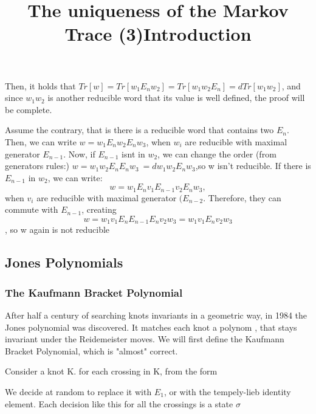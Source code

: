 \documentclass{article}
\begin{document}
{Then, it holds that \(Tr[w]=Tr[w_{1}E_{n}w_{2}] = Tr[w_{1}w_{2}E_{n}] = dTr[w_{1}w_{2}]\), and
since \(w_{1}w_{2}\) is another reducible word that its value is well defined, the proof will be complete.   


\title{The uniqueness of the Markov Trace (3)}
Assume the contrary, that is there is a reducible word that contains two \(E_{n}\).
Then, we can write \(w=w_{1}E_{n}w_{2}E_{n}w_{3}\), when \(w_{i}\) are reducible with maximal generator
\(E_{n-1}\). Now, if \(E_{n-1}\) isnt in \(w_{2}\), we can change the order (from generators rules:)
\(w=w_{1}w_{2}E_{n}E_{n}w_{3}\ = dw_{1}w_{2}E_{n}w_{3}\),so w isn't reducible.
If there is \(E_{n-1}\) in  \(w_{2}\), we can write:
\begin{displaymath}
 w=w_{1}E_{n}v_{1}E_{n-1}v_{2}E_{n}w_{3},
 \end{displaymath} 
 when 
 \(v_{i}\)  are reducible with maximal generator
\((E_{n-2}\). Therefore, they can commute with \(E_{n-1}\), creating 
\begin{displaymath}
w=w_{1}v_{1}E_{n}E_{n-1}E_{n}v_{2}w_{3}
= w_{1}v_{1}E_{n}v_{2}w_{3}
 \end{displaymath} 
 , so w again is not reducible
   



\subsection{Jones Polynomials} 
\subsubsection{The Kaufmann Bracket Polynomial}
\title{Introduction}
After half a century of searching knots invariants in a geometric way, in 1984 the Jones polynomial
was discovered. It matches each knot a polynom , that stays invariant under the Reidemeister moves.
We will first define the Kaufmann Bracket Polynomial, which is "almost" correct.

Consider a knot K. for each crossing in K, from the form 
\begin{center}
\end{center} 

We decide at random to replace it with \(E_{1}\), or with the tempely-lieb identity element.
Each decision like this for all the crossings is a state \(\sigma\)

}
\end{document}
